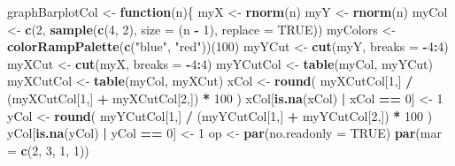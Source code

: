 \documentclass[]{book}
\newenvironment{Shaded}{\begin{snugshade}}{\end{snugshade}}
\newcommand{\KeywordTok}[1]{\textcolor[rgb]{0.13,0.29,0.53}{\textbf{#1}}}
\newcommand{\DataTypeTok}[1]{\textcolor[rgb]{0.13,0.29,0.53}{#1}}
\newcommand{\DecValTok}[1]{\textcolor[rgb]{0.00,0.00,0.81}{#1}}
\newcommand{\StringTok}[1]{\textcolor[rgb]{0.31,0.60,0.02}{#1}}
\newcommand{\OtherTok}[1]{\textcolor[rgb]{0.56,0.35,0.01}{#1}}
\newcommand{\ControlFlowTok}[1]{\textcolor[rgb]{0.13,0.29,0.53}{\textbf{#1}}}
\newcommand{\OperatorTok}[1]{\textcolor[rgb]{0.81,0.36,0.00}{\textbf{#1}}}
\newcommand{\NormalTok}[1]{#1}
\theoremstyle{definition}
\theoremstyle{definition}
\theoremstyle{definition}
\theoremstyle{remark}
\begin{document}
\begin{Shaded}
\begin{Highlighting}[]
\NormalTok{graphBarplotCol <-}\StringTok{ }\ControlFlowTok{function}\NormalTok{(n)\{}
\NormalTok{  myX <-}\StringTok{ }\KeywordTok{rnorm}\NormalTok{(n)}
\NormalTok{  myY <-}\StringTok{ }\KeywordTok{rnorm}\NormalTok{(n)}
\NormalTok{  myCol <-}\StringTok{ }\KeywordTok{c}\NormalTok{(}\DecValTok{2}\NormalTok{, }\KeywordTok{sample}\NormalTok{(}\KeywordTok{c}\NormalTok{(}\DecValTok{4}\NormalTok{, }\DecValTok{2}\NormalTok{), }\DataTypeTok{size =}\NormalTok{ (n }\OperatorTok{-}\StringTok{ }\DecValTok{1}\NormalTok{), }\DataTypeTok{replace =} \OtherTok{TRUE}\NormalTok{))}
\NormalTok{  myColors <-}\StringTok{ }\KeywordTok{colorRampPalette}\NormalTok{(}\KeywordTok{c}\NormalTok{(}\StringTok{"blue"}\NormalTok{, }\StringTok{"red"}\NormalTok{))(}\DecValTok{100}\NormalTok{)}
\NormalTok{  myYCut <-}\StringTok{ }\KeywordTok{cut}\NormalTok{(myY, }\DataTypeTok{breaks =} \OperatorTok{-}\DecValTok{4}\OperatorTok{:}\DecValTok{4}\NormalTok{)}
\NormalTok{  myXCut <-}\StringTok{ }\KeywordTok{cut}\NormalTok{(myX, }\DataTypeTok{breaks =} \OperatorTok{-}\DecValTok{4}\OperatorTok{:}\DecValTok{4}\NormalTok{)}
\NormalTok{  myYCutCol <-}\StringTok{ }\KeywordTok{table}\NormalTok{(myCol, myYCut)}
\NormalTok{  myXCutCol <-}\StringTok{ }\KeywordTok{table}\NormalTok{(myCol, myXCut)}
\NormalTok{  xCol <-}\StringTok{ }\KeywordTok{round}\NormalTok{(}
\NormalTok{    myXCutCol[}\DecValTok{1}\NormalTok{,] }\OperatorTok{/}\StringTok{ }\NormalTok{(myXCutCol[}\DecValTok{1}\NormalTok{,] }\OperatorTok{+}\StringTok{ }\NormalTok{myXCutCol[}\DecValTok{2}\NormalTok{,]) }\OperatorTok{*}\StringTok{ }\DecValTok{100}
\NormalTok{  )}
\NormalTok{  xCol[}\KeywordTok{is.na}\NormalTok{(xCol) }\OperatorTok{|}\StringTok{ }\NormalTok{xCol }\OperatorTok{==}\StringTok{ }\DecValTok{0}\NormalTok{] <-}\StringTok{ }\DecValTok{1}
\NormalTok{  yCol <-}\StringTok{ }\KeywordTok{round}\NormalTok{(}
\NormalTok{    myYCutCol[}\DecValTok{1}\NormalTok{,] }\OperatorTok{/}\StringTok{ }\NormalTok{(myYCutCol[}\DecValTok{1}\NormalTok{,] }\OperatorTok{+}\StringTok{ }\NormalTok{myYCutCol[}\DecValTok{2}\NormalTok{,]) }\OperatorTok{*}\StringTok{ }\DecValTok{100}
\NormalTok{  )}
\NormalTok{  yCol[}\KeywordTok{is.na}\NormalTok{(yCol) }\OperatorTok{|}\StringTok{ }\NormalTok{yCol }\OperatorTok{==}\StringTok{ }\DecValTok{0}\NormalTok{] <-}\StringTok{ }\DecValTok{1}
\NormalTok{  op <-}\StringTok{ }\KeywordTok{par}\NormalTok{(}\DataTypeTok{no.readonly =} \OtherTok{TRUE}\NormalTok{)}
  \KeywordTok{par}\NormalTok{(}\DataTypeTok{mar =} \KeywordTok{c}\NormalTok{(}\DecValTok{2}\NormalTok{, }\DecValTok{3}\NormalTok{, }\DecValTok{1}\NormalTok{, }\DecValTok{1}\NormalTok{))}

\end{Highlighting}
\end{Shaded}
\end{document}
